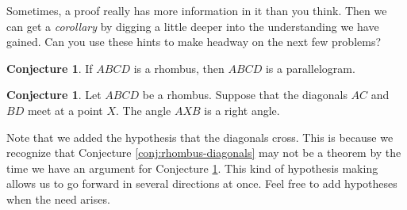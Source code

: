 \documentclass{tufte-handout}
\theoremstyle{definition}
\newtheorem{conjecture}[problem]{Conjecture}
\begin{document}
Sometimes, a proof really has more information in it than you think.
Then we can get a \emph{corollary} by digging a little deeper into the understanding we have gained.
Can you use these hints to make headway on the next few problems?

\begin{conjecture}\label{conj:rhombus-is-parallelogram}
If $ABCD$ is a rhombus, then $ABCD$ is a parallelogram.
\end{conjecture}


\begin{conjecture}\label{conj:rhombus-diagonals-angle}
Let $ABCD$ be a rhombus. Suppose that the diagonals $AC$ and $BD$ meet at a point $X$.
The angle $AXB$ is a right angle.
\end{conjecture}

Note that we added the hypothesis that the diagonals cross.
This is because we recognize that Conjecture \ref{conj:rhombus-diagonals} may not be a theorem by the time we have an argument for Conjecture \ref{conj:rhombus-diagonals-angle}.
This kind of hypothesis making allows us to go forward in several directions at once.
Feel free to add hypotheses when the need arises.
\end{document}
